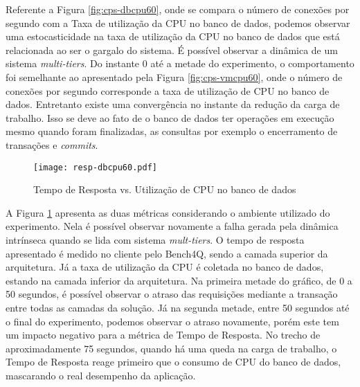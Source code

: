 Referente a Figura \ref{fig:cps-dbcpu60}, onde se compara o número de conexões por segundo com a Taxa de utilização da CPU no banco de dados, podemos observar uma estocasticidade na taxa de utilização da CPU no banco de dados que está relacionada ao ser o gargalo do sistema. É possível observar a dinâmica de um sistema \textit{multi-tiers}. Do instante 0 até a metade do experimento, o comportamento foi semelhante ao apresentado pela Figura \ref{fig:cps-vmcpu60}, onde o número de conexões por segundo corresponde a taxa de utilização de CPU no banco de dados. Entretanto existe uma convergência no instante da redução da carga de trabalho. Isso se deve ao fato de o banco de dados ter operações em execução mesmo quando foram finalizadas, as consultas por exemplo o encerramento de transações e \textit{commits}. 

\begin{figure}[htb]
	\centering
	\texttt{[image: resp-dbcpu60.pdf]}
	\caption{Tempo de Resposta vs. Utilização de CPU no banco de dados}
	\label{fig:resp-dbcpu60}
	\fdadospesquisa
\end{figure}

A Figura \ref{fig:resp-dbcpu60} apresenta as duas métricas considerando o ambiente utilizado do experimento. Nela é possível observar novamente a falha gerada pela dinâmica intrínseca quando se lida com sistema \textit{mult-tiers}. O tempo de resposta apresentado é medido no cliente pelo Bench4Q, sendo a camada superior da arquitetura. Já a taxa de utilização da CPU é coletada no banco de dados, estando na camada inferior da arquitetura. Na primeira metade do gráfico, de 0 a 50 segundos, é possível observar o atraso das requisições mediante a transação entre todas as camadas da solução. Já na segunda metade, entre 50 segundos até o final do experimento, podemos observar o atraso novamente, porém este tem um impacto negativo para a métrica de Tempo de Resposta. No trecho de aproximadamente 75 segundos, quando há uma queda na carga de trabalho, o Tempo de Resposta reage primeiro que o consumo de CPU do banco de dados, mascarando o real desempenho da aplicação.
